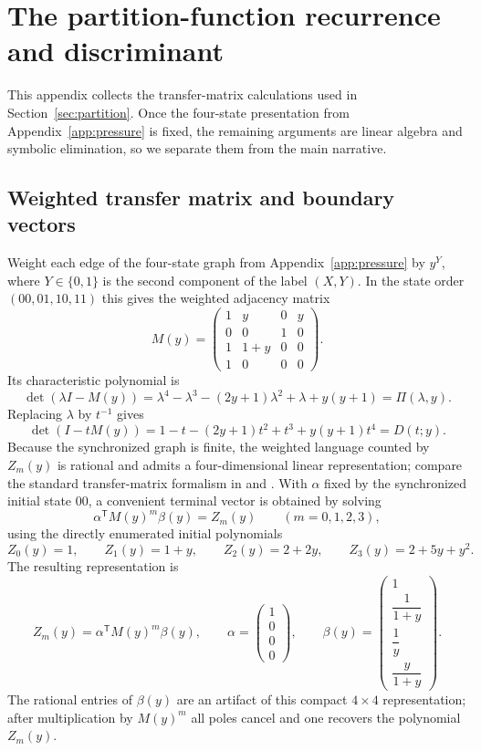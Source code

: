 \section{The partition-function recurrence and discriminant}
\label{app:recurrence}

This appendix collects the transfer-matrix calculations used in Section~\ref{sec:partition}. Once the four-state presentation from Appendix~\ref{app:pressure} is fixed, the remaining arguments are linear algebra and symbolic elimination, so we separate them from the main narrative.

\subsection{Weighted transfer matrix and boundary vectors}
Weight each edge of the four-state graph from Appendix~\ref{app:pressure} by \(y^{Y}\), where \(Y\in\{0,1\}\) is the second component of the label \((X,Y)\). In the state order \((00,01,10,11)\) this gives the weighted adjacency matrix
\[
M(y)=
\begin{pmatrix}
1&y&0&y\\
0&0&1&0\\
1&1+y&0&0\\
1&0&0&0
\end{pmatrix}.
\]
Its characteristic polynomial is
\[
\det(\lambda I-M(y))
=
\lambda^4-\lambda^3-(2y+1)\lambda^2+\lambda+y(y+1)
=
\Pi(\lambda,y).
\]
Replacing \(\lambda\) by \(t^{-1}\) gives
\[
\det(I-tM(y))
=
1-t-(2y+1)t^2+t^3+y(y+1)t^4
=
D(t;y).
\]
Because the synchronized graph is finite, the weighted language counted by \(Z_m(y)\) is rational and admits a four-dimensional linear representation; compare the standard transfer-matrix formalism in \cite[Chapter~6]{AlloucheShallit2003} and \cite{GrabnerKirschenhoferTichy2002}. With \(\alpha\) fixed by the synchronized initial state \(00\), a convenient terminal vector is obtained by solving
\[
\alpha^{\mathsf T}M(y)^m\beta(y)=Z_m(y)\qquad (m=0,1,2,3),
\]
using the directly enumerated initial polynomials
\[
Z_0(y)=1,\qquad
Z_1(y)=1+y,\qquad
Z_2(y)=2+2y,\qquad
Z_3(y)=2+5y+y^2.
\]
The resulting representation is
\[
Z_m(y)=\alpha^{\mathsf T}M(y)^m\beta(y),
\qquad
\alpha=
\begin{pmatrix}
1\\ 0\\ 0\\ 0
\end{pmatrix},
\qquad
\beta(y)=
\begin{pmatrix}
1\\[1mm]
\dfrac{1}{1+y}\\[2mm]
\dfrac{1}{y}\\[2mm]
\dfrac{y}{1+y}
\end{pmatrix}.
\]
The rational entries of \(\beta(y)\) are an artifact of this compact \(4\times4\) representation; after multiplication by \(M(y)^m\) all poles cancel and one recovers the polynomial \(Z_m(y)\).


